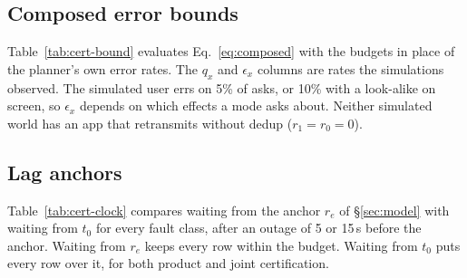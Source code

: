 


\subsection{Composed error bounds}
\label{app:composed}
Table~\ref{tab:cert-bound} evaluates Eq.~\eqref{eq:composed} with the budgets in place of the planner's own error rates. The $q_x$ and $\epsilon_x$ columns are rates the
simulations observed. The simulated user errs on 5\% of asks, or 10\% with a look-alike on screen, so $\epsilon_x$ depends on which effects a mode asks about. Neither
simulated world has an app that retransmits without dedup ($r_1{=}r_0{=}0$).



\subsection{Lag anchors}
\label{app:anchor}
Table~\ref{tab:cert-clock} compares waiting from the anchor $r_e$ of \S\ref{sec:model} with waiting from $t_0$ for every fault class, after an outage of 5 or 15\,s
before the anchor. Waiting from $r_e$ keeps every row within the budget. Waiting from $t_0$ puts every row over it, for both product and joint certification.


